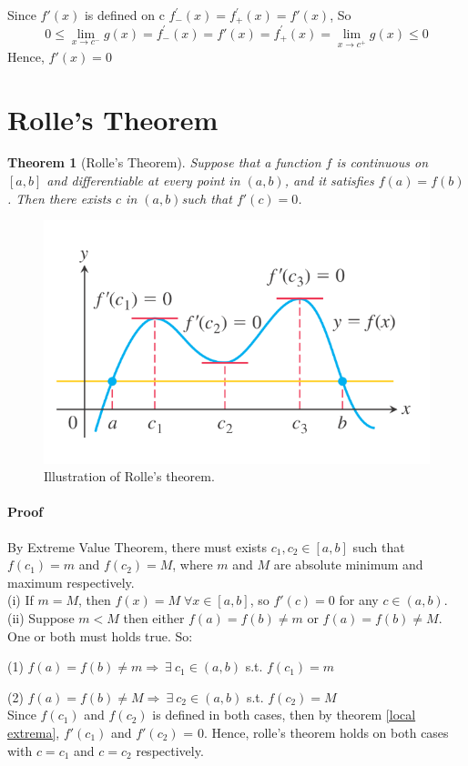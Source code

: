\documentclass[12pt]{article}
\newtheorem{theorem}{Theorem}
\begin{document}
\noindent
Since $f'(x)$ is defined on c $f^{'}_{-} (x) = f^{'}_{+} (x) = f'(x)$, So
\[
    0 \leq \lim_{x \to c^{ - }} g(x) = f^{'}_{-} (x) = f'(x) = f^{'}_{+} (x) = \lim_{x \to c^{ + }} g(x) \leq 0
\]
Hence, $f'(x) = 0$

\section{Rolle's Theorem}
\begin{theorem}[Rolle's Theorem] 
    Suppose that a function $f$ is continuous on $[a, b]$ and differentiable at every point in $(a, b)$, and it satisfies $f(a) = f(b)$.
    Then there exists $c$ in $(a, b)$such that $f'(c) = 0$.
\end{theorem}

\begin{figure}[h!]
     \centering
     \includegraphics[width = 0.5\linewidth]{Images/rolle's theorem.png}
     \caption{Illustration of Rolle's theorem. }
\end{figure}

\paragraph{Proof}
By Extreme Value Theorem, there must exists $c_1, c_2 \in [a,b]$ such that $f(c_1) = m$ and $f(c_2) = M$, where 
$m$ and $M$ are absolute minimum and maximum respectively.  \\

\noindent
(i) If $m = M$, then $f(x) = M \; \forall x \in [a, b]$, so $f'(c) = 0$ for any $c \in (a, b)$.  \\
(ii) Suppose $m < M$ then either $f(a) = f(b) \neq m$ or $f(a) = f(b) \neq M$. One or both must holds true. So:

(1) $f(a) = f(b) \neq m \Rightarrow \: \exists \: c_1 \in (a,b) $ s.t. $f(c_1) = m$ 

(2) $f(a) = f(b) \neq M \Rightarrow \: \exists \: c_2 \in (a,b) $ s.t. $f(c_2) = M$ \\

\noindent
Since $f(c_1)$ and $f(c_2)$ is defined in both cases, then by theorem \ref{local extrema}, $f'(c_1)$ and $f'(c_2)$ = 0. Hence, rolle's theorem
holds on both cases with $c = c_1$ and $c = c_2$ respectively.
\end{document}
